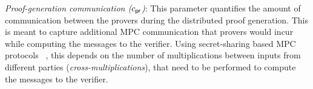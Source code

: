 \noindent\textit{Proof-generation communication ($c_\mathsf{pr}$)}:
This parameter quantifies the amount of communication between the provers during the
distributed proof generation. This is meant to capture additional MPC
communication that provers would incur while computing the messages to the
verifier. Using secret-sharing based MPC protocols ~\cite{GMW87, BGW88, SPDZ},
this depends on the number of multiplications between inputs from different
parties ({\em cross-multiplications}), that need to be performed to compute the
messages to the verifier. 



